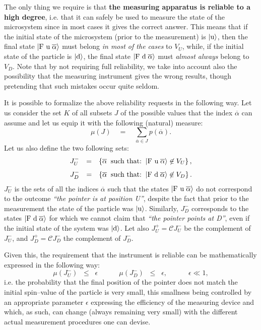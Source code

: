 \documentclass[12pt]{article}
\begin{document}
The only thing we require is that {\bf the measuring apparatus is
reliable to a high degree}, i.e. that it can safely be used to
measure the state of the microsystem since in most cases it gives
the correct answer. This means that if the initial state of the
microsystem (prior to the measurement) is $|\makebox{u}\rangle$,
then the final state $|\makebox{F u}\; \overline{\alpha}\rangle$
must belong {\it in most of the cases} to $V_{U}$, while, if the
initial state of the particle is $|\makebox{d}\rangle$, the final
state $|\makebox{F d}\; \overline{\alpha}\rangle$ must {\it almost
always} belong to $V_{D}$. Note that by not requiring full
reliability, we take into account also the possibility that the
measuring  instrument  gives the wrong results, though pretending
that such mistakes occur quite seldom.

It is possible to formalize the above reliability requests in the
following way. Let us consider the set $K$ of all subsets $J$ of
the possible values that the index $\overline{\alpha}$ can assume
and let us equip it with the following (natural) measure:
\[
\mu(J)\quad =\quad \sum_{\overline{\alpha}\in J}
p(\overline{\alpha}).
\]
Let us also define the two following sets:
\[
\begin{array}{lcl}
J^{-}_{U} & = & \left\{\overline{\alpha}\;\; \makebox{such that:}
\;\; |\makebox{F u}\; \overline{\alpha}\rangle \not\in V_{U}
\right\},
\end{array}
\]
\[
\begin{array}{lcl}
J^{-}_{D} & = & \left\{\overline{\alpha}\;\; \makebox{such that:}
\;\; |\makebox{F d}\;\overline{\alpha}\rangle \not\in V_{D}
\right\}.
\end{array}
\]
$J^{-}_{U}$ is the sets of all the indices $\overline{\alpha}$
such that the states $|\makebox{F u}\;\overline{\alpha}\rangle$ do
not correspond to the outcome {\it ``the pointer is at position
U''}, despite the fact that prior to the measurement the state of
the particle was $|\makebox{u} \rangle$. Similarly, $J^{-}_{D}$
corresponds to the states $|\makebox{F d}\; \overline{\alpha}
\rangle$ for which we cannot claim that {\it ``the pointer points
at D''}, even if the initial state of the system was
$|\makebox{d}\rangle$. Let also $J^{+}_{U} = {\mathcal
C}J^{-}_{U}$ be the complement of $J^{-}_{U}$, and $J^{+}_{D} =
{\mathcal C} J^{-}_{D}$ the complement of $J^{-}_{D}$.

Given this, the requirement that the instrument is reliable can be
mathematically expressed in the following way:
\begin{equation} \label{req3}
\mu(J^{-}_{U})\;\; \leq\;\; \epsilon \qquad\quad
\mu(J^{-}_{D})\;\; \leq\;\; \epsilon, \qquad\quad \epsilon \ll 1,
\end{equation}
i.e. the probability that the final position of the pointer does
not match the initial spin--value of the particle is very small,
this smallness being controlled by an appropriate parameter
$\epsilon$ expressing the efficiency of the measuring device and
which, as such, can change (always remaining very small) with the
different actual measurement procedures one can devise.
\end{document}

